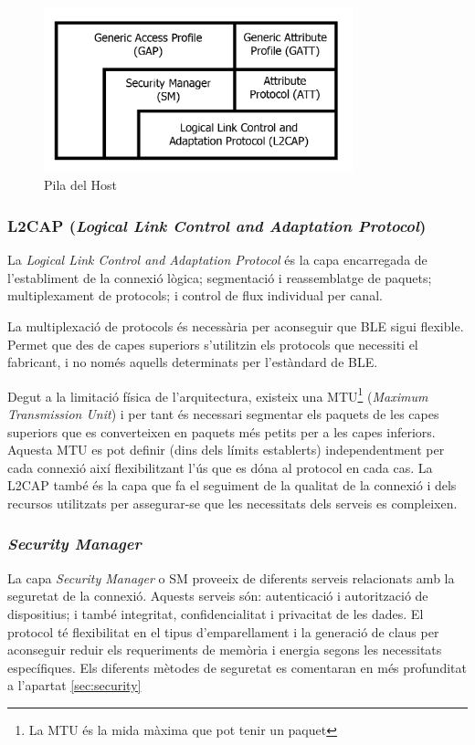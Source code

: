 \begin{figure}[h!]
	\begin{center}
		\includegraphics[width=0.8\textwidth]{./images/ble_host_stack.png}
		\caption{Pila del Host \cite{ble_stack}}
			\label{host_stack}
	\end{center}
\end{figure}

\subsubsection{L2CAP (\textit{Logical Link Control and Adaptation Protocol})}
La \textit{Logical Link Control and Adaptation Protocol} és la capa encarregada de l'establiment de la connexió lògica; segmentació i reassemblatge de paquets; multiplexament de protocols;  i control de flux individual per canal.

La multiplexació de protocols és necessària per aconseguir que BLE sigui flexible.
Permet que des de capes superiors s'utilitzin els protocols que necessiti el fabricant, i no només aquells determinats per l'estàndard de BLE.

Degut a la limitació física de l'arquitectura, existeix una MTU\footnote{La MTU és la mida màxima que pot tenir un paquet} (\textit{Maximum Transmission Unit}) i per tant és necessari segmentar els paquets de les capes superiors que es converteixen en paquets més petits per a les capes inferiors.
Aquesta MTU es pot definir (dins dels límits establerts) independentment per cada connexió així flexibilitzant l'ús que es dóna al protocol en cada cas.
La L2CAP també és la capa que fa el seguiment de la qualitat de la connexió i dels recursos utilitzats per assegurar-se que les necessitats dels serveis es compleixen.

\subsubsection{\textit{Security Manager}}
La capa \textit{Security Manager} o SM proveeix de diferents serveis relacionats amb la seguretat de la connexió.
Aquests serveis són: autenticació i autorització de dispositius; i també integritat, confidencialitat i privacitat de les dades.
El protocol té flexibilitat en el tipus d'emparellament i la generació de claus per aconseguir reduir els requeriments de memòria i energia segons les necessitats específiques.
Els diferents mètodes de seguretat es comentaran en més profunditat a l'apartat \ref{sec:security}


